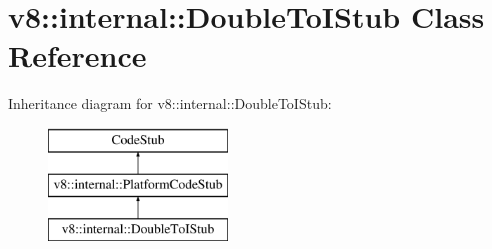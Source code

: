 \hypertarget{classv8_1_1internal_1_1_double_to_i_stub}{}\section{v8\+:\+:internal\+:\+:Double\+To\+I\+Stub Class Reference}
\label{classv8_1_1internal_1_1_double_to_i_stub}
Inheritance diagram for v8\+:\+:internal\+:\+:Double\+To\+I\+Stub\+:\begin{figure}[H]
\begin{center}
\leavevmode
\includegraphics[height=3.000000cm]{classv8_1_1internal_1_1_double_to_i_stub}
\end{center}
\end{figure}
